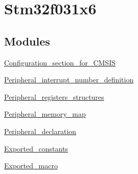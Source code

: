 \hypertarget{group__stm32f031x6}{}\section{Stm32f031x6}
\label{group__stm32f031x6}
\subsection*{Modules}
\begin{DoxyCompactItemize}
\item 
\hyperlink{group___configuration__section__for___c_m_s_i_s}{Configuration\+\_\+section\+\_\+for\+\_\+\+C\+M\+S\+IS}
\item 
\hyperlink{group___peripheral__interrupt__number__definition}{Peripheral\+\_\+interrupt\+\_\+number\+\_\+definition}
\item 
\hyperlink{group___peripheral__registers__structures}{Peripheral\+\_\+registers\+\_\+structures}
\item 
\hyperlink{group___peripheral__memory__map}{Peripheral\+\_\+memory\+\_\+map}
\item 
\hyperlink{group___peripheral__declaration}{Peripheral\+\_\+declaration}
\item 
\hyperlink{group___exported__constants}{Exported\+\_\+constants}
\item 
\hyperlink{group___exported__macro}{Exported\+\_\+macro}
\end{DoxyCompactItemize}

